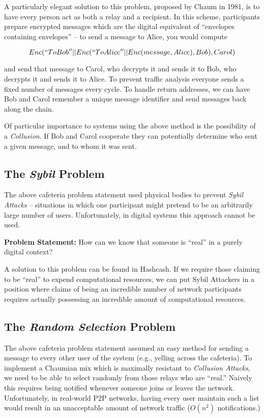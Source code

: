A particularly elegant solution to this problem, proposed by Chaum in
1981\cite{chaum-mix}, is to have every person act as both a relay and
a recipient. In this scheme, participants prepare encrypted messages
which are the digital equivalent of ``envelopes containing envelopes''
-- to send a message to Alice, you would compute

$$Enc(``To Bob'' || Enc(``To Alice'' || Enc(message, Alice), Bob), Carol)$$

and send that message to Carol, who decrypts it and sends it to Bob,
who decrypts it and sends it to Alice. To prevent traffic analysis
everyone sends a fixed number of messages every cycle.  To handle
return addresses, we can have Bob and Carol remember a unique
message identifier and send messages back along the chain.

Of particular importance to systems using the above method is the
possibility of a \emph{Collusion}. If Bob and Carol cooperate they can
potentially determine who sent a given message, and to whom it was
sent.

\subsection*{The \emph{Sybil} Problem}

The above cafeteria problem statement used physical bodies to
prevent \emph{Sybil Attacks} -- situations in which one participant
might pretend to be an arbitrarily large number of
users. Unfortunately, in digital systems this approach cannot be used.

\textbf{Problem Statement:} How can we know that someone is ``real''
in a purely digital context?

A solution to this problem can be found in Hashcash\cite{CHORD}. If we
require those claiming to be ``real'' to expend computational
resources, we can put Sybil Attackers in a position where claims of
being an incredible number of network participants requires actually
possessing an incredible amount of computational resources.

\subsection*{The \emph{Random Selection} Problem}

The above cafeteria problem statement assumed an easy method for
sending a message to every other user of the system (e.g., yelling across
the cafeteria). To implement a Chaumian mix which is maximally
resistant to \emph{Collusion Attacks}, we need to be able to select
randomly from those relays who are ``real.'' Naively this requires
being notified whenever someone joins or leaves the network.
Unfortunately, in real-world P2P networks, having every user maintain
such a list would result in an unacceptable amount of network traffic
($O(n^2)$ notifications.)

